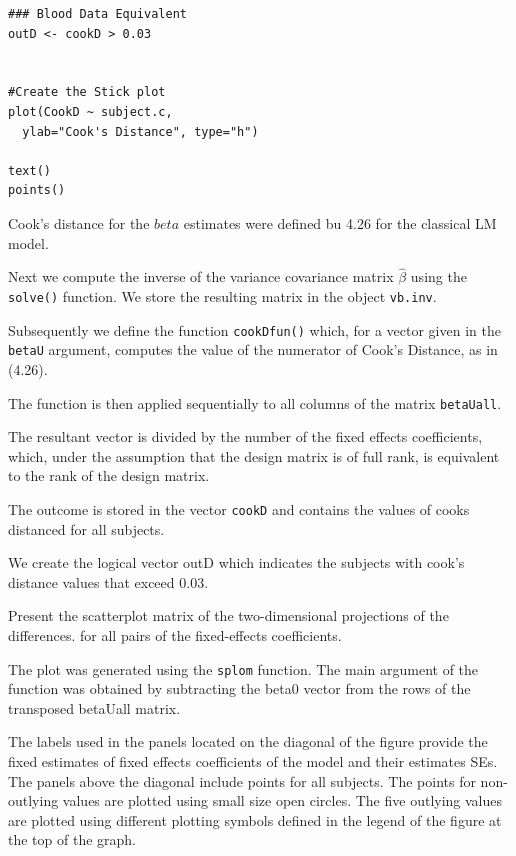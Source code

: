 \documentclass[a4paper,12pt]{article}
\begin{document}
\begin{framed}
\begin{verbatim}
### Blood Data Equivalent
outD <- cookD > 0.03


#Create the Stick plot
plot(CookD ~ subject.c, 
  ylab="Cook's Distance", type="h")

text()
points()
\end{verbatim}
\end{framed}

Cook's distance for the $beta$ estimates were defined bu 4.26 for the classical LM model.


Next we compute the inverse of the variance covariance matrix $\hat{\beta}$ using the \texttt{solve()} function.
We store the resulting matrix in the object \texttt{vb.inv}.

Subsequently we define the function \texttt{cookDfun()} which, for a vector given in
the \texttt{betaU} argument, computes the value of the numerator of Cook's Distance, as in (4.26).

The function is then applied sequentially to all columns of the matrix \texttt{betaUall}.


The resultant vector is divided by the number of the fixed effects coefficients, which, under the assumption that the design matrix is of full rank, 
is equivalent to the rank of the design matrix.



The outcome is stored in the vector \texttt{cookD} and contains the values of cooks distanced for all subjects.

We create the logical vector outD which indicates the subjects with cook's distance values that exceed 0.03.

Present the scatterplot matrix of the two-dimensional projections of the differences.
for all pairs of the fixed-effects coefficients.

The plot was generated using the \texttt{splom} function. The main argument of the 
function was obtained by subtracting the beta0 vector from the rows of the transposed
betaUall matrix.

The labels used in the panels located on the diagonal of the figure provide the fixed estimates of fixed effects coefficients
of the model and their estimates SEs.
The panels above the diagonal include points for all subjects.
The points for non-outlying values are plotted using small size open circles.
The five outlying values are plotted using different plotting symbols defined in the
legend of the figure at the top of the graph.
\end{document}
